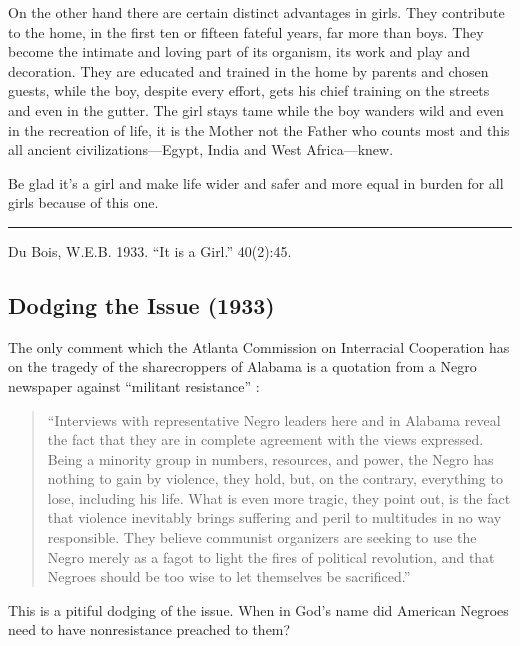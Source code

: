\documentclass[letterpaper,10pt,english]{jupyterBook}
\begin{document}
\sphinxAtStartPar
On the other hand there are certain distinct advantages in girls. They contribute to the home, in the first ten or fifteen fateful years, far more than boys. They become the intimate and loving part of its organism, its work and play and decoration. They are educated and trained in the home by parents and chosen guests, while the boy, despite every effort, gets his chief training on the streets and even in the gutter. The girl stays tame while the boy wanders wild and even in the re\sphinxhyphen{}creation of life, it is the Mother not the Father who counts most and this all ancient civilizations—Egypt, India and West Africa—knew.

\sphinxAtStartPar
Be glad it’s a girl and make life wider and safer and more equal in burden for all girls because of this one.


\bigskip\hrule\bigskip


\sphinxAtStartPar
{} Du Bois, W.E.B. 1933. “It is a Girl.”  40(2):45.


\subsection{Dodging the Issue (1933)}
\label{\detokenize{Volumes/40/02/dodging_the_issue:dodging-the-issue-1933}}\label{\detokenize{Volumes/40/02/dodging_the_issue::doc}}
\sphinxAtStartPar
The  only comment which the Atlanta Commission on Interracial Cooperation has on the tragedy of the share\sphinxhyphen{}croppers of Alabama is a quotation from a Negro newspaper against “militant resistance” :
\begin{quote}

\sphinxAtStartPar
“Interviews with representative Negro leaders here and in Alabama reveal the fact that they are in complete agreement with the views expressed. Being a minority group in numbers, resources, and power, the Negro has nothing to gain by violence, they hold, but, on the contrary, everything to lose, including his life. What is even more tragic, they point out, is the fact that violence inevitably brings suffering and peril to multitudes in no way responsible. They believe communist organizers are seeking to use the Negro merely as a fagot to light the fires of political revolution, and that Negroes should be too wise to let themselves be sacrificed.”
\end{quote}

\sphinxAtStartPar
This is a pitiful dodging of the issue. When in God’s name did American Negroes need to have non\sphinxhyphen{}resistance preached to them?
\end{document}
